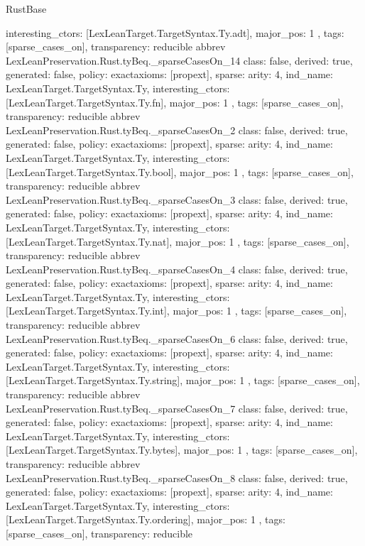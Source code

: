 \begin{lexlean}{RustBase}
\begin{coremodule}
{{    interesting_ctors: [LexLeanTarget.TargetSyntax.Ty.adt],
    major_pos: 1
  },
  tags: [sparse_cases_on],
  transparency: reducible
}
abbrev LexLeanPreservation.Rust.tyBeq._sparseCasesOn_14 {
  class: false,
  derived: true,
  generated: false,
  policy: exact{axioms: [propext]},
  sparse: {
    arity: 4,
    ind_name: LexLeanTarget.TargetSyntax.Ty,
    interesting_ctors: [LexLeanTarget.TargetSyntax.Ty.fn],
    major_pos: 1
  },
  tags: [sparse_cases_on],
  transparency: reducible
}
abbrev LexLeanPreservation.Rust.tyBeq._sparseCasesOn_2 {
  class: false,
  derived: true,
  generated: false,
  policy: exact{axioms: [propext]},
  sparse: {
    arity: 4,
    ind_name: LexLeanTarget.TargetSyntax.Ty,
    interesting_ctors: [LexLeanTarget.TargetSyntax.Ty.bool],
    major_pos: 1
  },
  tags: [sparse_cases_on],
  transparency: reducible
}
abbrev LexLeanPreservation.Rust.tyBeq._sparseCasesOn_3 {
  class: false,
  derived: true,
  generated: false,
  policy: exact{axioms: [propext]},
  sparse: {
    arity: 4,
    ind_name: LexLeanTarget.TargetSyntax.Ty,
    interesting_ctors: [LexLeanTarget.TargetSyntax.Ty.nat],
    major_pos: 1
  },
  tags: [sparse_cases_on],
  transparency: reducible
}
abbrev LexLeanPreservation.Rust.tyBeq._sparseCasesOn_4 {
  class: false,
  derived: true,
  generated: false,
  policy: exact{axioms: [propext]},
  sparse: {
    arity: 4,
    ind_name: LexLeanTarget.TargetSyntax.Ty,
    interesting_ctors: [LexLeanTarget.TargetSyntax.Ty.int],
    major_pos: 1
  },
  tags: [sparse_cases_on],
  transparency: reducible
}
abbrev LexLeanPreservation.Rust.tyBeq._sparseCasesOn_6 {
  class: false,
  derived: true,
  generated: false,
  policy: exact{axioms: [propext]},
  sparse: {
    arity: 4,
    ind_name: LexLeanTarget.TargetSyntax.Ty,
    interesting_ctors: [LexLeanTarget.TargetSyntax.Ty.string],
    major_pos: 1
  },
  tags: [sparse_cases_on],
  transparency: reducible
}
abbrev LexLeanPreservation.Rust.tyBeq._sparseCasesOn_7 {
  class: false,
  derived: true,
  generated: false,
  policy: exact{axioms: [propext]},
  sparse: {
    arity: 4,
    ind_name: LexLeanTarget.TargetSyntax.Ty,
    interesting_ctors: [LexLeanTarget.TargetSyntax.Ty.bytes],
    major_pos: 1
  },
  tags: [sparse_cases_on],
  transparency: reducible
}
abbrev LexLeanPreservation.Rust.tyBeq._sparseCasesOn_8 {
  class: false,
  derived: true,
  generated: false,
  policy: exact{axioms: [propext]},
  sparse: {
    arity: 4,
    ind_name: LexLeanTarget.TargetSyntax.Ty,
    interesting_ctors: [LexLeanTarget.TargetSyntax.Ty.ordering],
    major_pos: 1
  },
  tags: [sparse_cases_on],
  transparency: reducible
}
\end{coremodule}
\end{lexlean}
